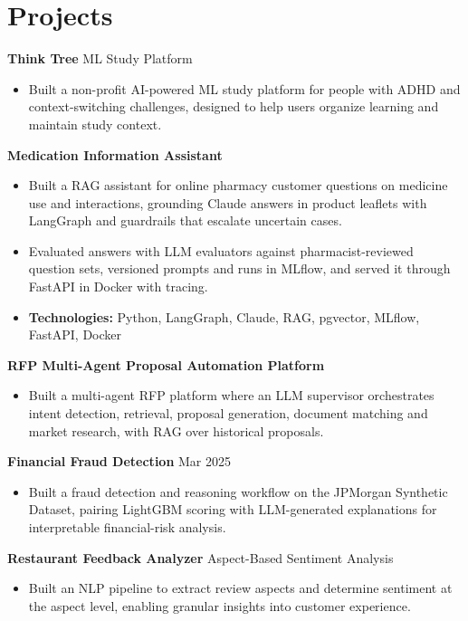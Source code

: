 \documentclass[10pt,a4paper]{article}
\begin{document}
\section{Projects}
\textbf{Think Tree} \textbar{} ML Study Platform\par
\begin{itemize}
  \item Built a non-profit AI-powered ML study platform for people with ADHD and context-switching challenges, designed to help users organize learning and maintain study context.
\end{itemize}
\textbf{Medication Information Assistant}\par
\begin{itemize}
  \item Built a RAG assistant for online pharmacy customer questions on medicine use and interactions, grounding Claude answers in product leaflets with LangGraph and guardrails that escalate uncertain cases.
  \item Evaluated answers with LLM evaluators against pharmacist-reviewed question sets, versioned prompts and runs in MLflow, and served it through FastAPI in Docker with tracing.
  \item \textbf{Technologies:} Python, LangGraph, Claude, RAG, pgvector, MLflow, FastAPI, Docker
\end{itemize}
\textbf{RFP Multi-Agent Proposal Automation Platform}\par
\begin{itemize}
  \item Built a multi-agent RFP platform where an LLM supervisor orchestrates intent detection, retrieval, proposal generation, document matching and market research, with RAG over historical proposals.
\end{itemize}
\textbf{Financial Fraud Detection} \textbar{} Mar 2025\par
\begin{itemize}
  \item Built a fraud detection and reasoning workflow on the JPMorgan Synthetic Dataset, pairing LightGBM scoring with LLM-generated explanations for interpretable financial-risk analysis.
\end{itemize}
\textbf{Restaurant Feedback Analyzer} \textbar{} Aspect-Based Sentiment Analysis\par
\begin{itemize}
  \item Built an NLP pipeline to extract review aspects and determine sentiment at the aspect level, enabling granular insights into customer experience.
\end{itemize}
\end{document}
